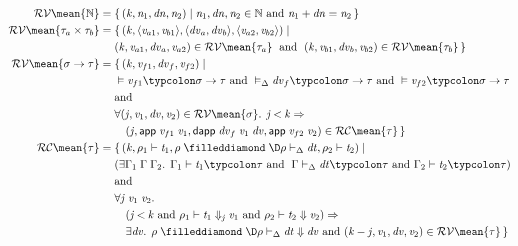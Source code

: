 \begin{figure}[h!]
\begin{align*}
  \ensuremath{\mathcal{RV}\mean{\mathbb{N}}} ={}& \{ \, \ensuremath{(\Varid{k},\Varid{n}_{1},\Varid{dn},\Varid{n}_{2})\mid\Varid{n}_{1},\Varid{dn},\Varid{n}_{2}\in \mathbb{N}\text{ and }\Varid{n}_{1}\mathbin{+}\Varid{dn}\mathrel{=}\Varid{n}_{2}} \, \}\\
  \ensuremath{\mathcal{RV}\mean{\tau_a\times\tau_b}} ={} & \{ \, \ensuremath{(\Varid{k},\langle\Varid{v}_{a1},\Varid{v}_{b1}\rangle,\langle\Varid{dv}_a,\Varid{dv}_b\rangle,\langle\Varid{v}_{a2},\Varid{v}_{b2}\rangle)\mid\\&(\Varid{k},\Varid{v}_{a1},\Varid{dv}_a,\Varid{v}_{a2})\in \mathcal{RV}\mean{\tau_a}\;\text{ and }\;(\Varid{k},\Varid{v}_{b1},\Varid{dv}_b,\Varid{v}_{b2})\in \mathcal{RV}\mean{\tau_b}} \, \}\\
  \ensuremath{\mathcal{RV}\mean{\sigma\to \tau}} ={}
                  \ensuremath{&}\{ \, \ensuremath{(\Varid{k},\Varid{v}_{f1},\Varid{dv}_f,\Varid{v}_{f2})\mid\\&\vDash\Varid{v}_{f1}\typcolon\sigma\to \tau\text{ and }\vDash_{\Delta}\Varid{dv}_f\typcolon\sigma\to \tau\text{ and }\vDash\Varid{v}_{f2}\typcolon\sigma\to \tau\\&\text{and}\\&\forall (\Varid{j},\Varid{v}_{1},\Varid{dv},\Varid{v}_{2})\in \mathcal{RV}\mean{\sigma}\hsforall \hsdot{\circ }{\mathpunct{.}}\;\Varid{j}\mathbin{<}\Varid{k}\Rightarrow\\&\quad(\Varid{j},\mathsf{app}\;\Varid{v}_{f1}\;\Varid{v}_{1},\mathsf{dapp}\;\Varid{dv}_f\;\Varid{v}_{1}\;\Varid{dv},\mathsf{app}\;\Varid{v}_{f2}\;\Varid{v}_{2})\in \mathcal{RC}\mean{\tau}} \, \}\\
  \ensuremath{\mathcal{RC}\mean{\tau}} ={}&
                  \{ \, \ensuremath{(\Varid{k},\rho_{1}\vdash\Varid{t}_{1},\rho\mathrel{\filleddiamond}\D\rho\vdash_{\Delta}\Varid{dt},\rho_{2}\vdash\Varid{t}_{2})\mid\\&(\exists \Gamma_{1}\hsforall \;\Gamma\;\Gamma_{2}\hsdot{\circ }{\mathpunct{.}}\;\Gamma_{1}\vdash\Varid{t}_{1}\typcolon\tau\text{ and }\;\Gamma\vdash_{\Delta}\Varid{dt}\typcolon\tau\text{ and }\Gamma_{2}\vdash\Varid{t}_{2}\typcolon\tau)\\&\text{and}\\&\forall \Varid{j}\hsforall \;\Varid{v}_{1}\;\Varid{v}_{2}\hsdot{\circ }{\mathpunct{.}}\\&\quad(\Varid{j}\mathbin{<}\Varid{k}\text{ and }\rho_{1}\vdash\Varid{t}_{1}\Downarrow_{\Varid{j}}\Varid{v}_{1}\text{ and }\rho_{2}\vdash\Varid{t}_{2}\Downarrow\Varid{v}_{2})\Rightarrow\\&\quad\exists \Varid{dv}\hsforall \hsdot{\circ }{\mathpunct{.}}\;\rho\mathrel{\filleddiamond}\D\rho\vdash_{\Delta}\Varid{dt}\Downarrow\Varid{dv}\text{ and }(\Varid{k}\mathbin{-}\Varid{j},\Varid{v}_{1},\Varid{dv},\Varid{v}_{2})\in \mathcal{RV}\mean{\tau}} \, \}\\

\end{align*}
\end{figure}
